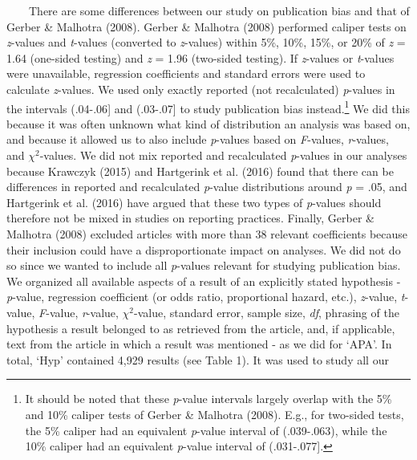 \documentclass[
  12pt,
]{article}
\begin{document}
~~~~There are some differences between our study on publication bias and
that of Gerber \& Malhotra (2008). Gerber \& Malhotra (2008) performed
caliper tests on \emph{z}-values and \emph{t}-values (converted to
\emph{z}-values) within 5\%, 10\%, 15\%, or 20\% of \emph{z} = 1.64
(one-sided testing) and \emph{z} = 1.96 (two-sided testing). If
\emph{z}-values or \emph{t}-values were unavailable, regression
coefficients and standard errors were used to calculate \emph{z}-values.
We used only exactly reported (not recalculated) \emph{p}-values in the
intervals (.04-.06{]} and (.03-.07{]} to study publication bias
instead.\footnote{It should be noted that these \emph{p}-value intervals
  largely overlap with the 5\% and 10\% caliper tests of Gerber \&
  Malhotra (2008). E.g., for two-sided tests, the 5\% caliper had an
  equivalent \emph{p}-value interval of (.039-.063), while the 10\%
  caliper had an equivalent \emph{p}-value interval of (.031-.077{]}.}
We did this because it was often unknown what kind of distribution an
analysis was based on, and because it allowed us to also include
\emph{p}-values based on \emph{F}-values, \emph{r}-values, and
\(\chi^2\)-values. We did not mix reported and recalculated
\emph{p}-values in our analyses because Krawczyk (2015) and Hartgerink
et al. (2016) found that there can be differences in reported and
recalculated \emph{p}-value distributions around \emph{p} = .05, and
Hartgerink et al. (2016) have argued that these two types of
\emph{p}-values should therefore not be mixed in studies on reporting
practices. Finally, Gerber \& Malhotra (2008) excluded articles with
more than 38 relevant coefficients because their inclusion could have a
disproportionate impact on analyses. We did not do so since we wanted to
include all \emph{p}-values relevant for studying publication bias.\\
\hspace*{0.333em}\hspace*{0.333em}\hspace*{0.333em}\hspace*{0.333em}We
organized all available aspects of a result of an explicitly stated
hypothesis - \emph{p}-value, regression coefficient (or odds ratio,
proportional hazard, etc.), \emph{z}-value, \emph{t}-value,
\emph{F}-value, \emph{r}-value, \(\chi^2\)-value, standard error, sample
size, \emph{df}, phrasing of the hypothesis a result belonged to as
retrieved from the article, and, if applicable, text from the article in
which a result was mentioned - as we did for `APA'. In total, `Hyp'
contained 4,929 results (see Table 1). It was used to study all our
\end{document}
